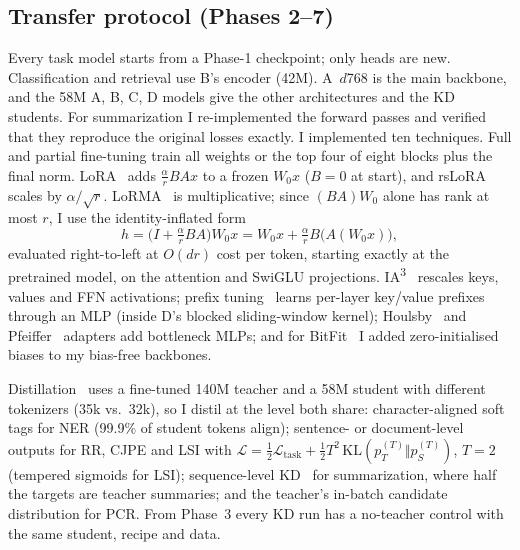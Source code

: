 \documentclass[11pt, oneside]{article}
\begin{document}
\subsection{Transfer protocol (Phases 2--7)}
Every task model starts from a Phase-1 checkpoint; only heads are new. Classification and retrieval use B's encoder
(42M). A~$d$768 is the main backbone, and the 58M A, B, C, D models give the other architectures and the KD students.
For summarization I re-implemented the forward passes and verified that they reproduce the original losses exactly.
I implemented ten techniques. Full and partial fine-tuning train all weights or the top four of eight blocks plus the
final norm. LoRA~\cite{hu2022lora} adds $\tfrac{\alpha}{r}BAx$ to a frozen $W_0x$ ($B=0$ at start), and
rsLoRA~\cite{kalajdzievski2023rslora} scales by $\alpha/\sqrt{r}$. LoRMA~\cite{bihany2025lorma} is multiplicative; since
$(BA)W_0$ alone has rank at most $r$, I use the identity-inflated form
\begin{equation}
h=\bigl(I+\tfrac{\alpha}{r}BA\bigr)W_0x = W_0x+\tfrac{\alpha}{r}B\bigl(A(W_0x)\bigr),
\end{equation}
evaluated right-to-left at $O(dr)$ cost per token, starting exactly at the pretrained model, on the attention and
SwiGLU projections. IA\textsuperscript{3}~\cite{liu2022ia3} rescales keys, values and FFN activations; prefix
tuning~\cite{li2021prefix} learns per-layer key/value prefixes through an MLP (inside D's blocked sliding-window
kernel); Houlsby~\cite{houlsby2019adapters} and Pfeiffer~\cite{pfeiffer2021adapterfusion} adapters add bottleneck MLPs;
and for BitFit~\cite{benzaken2022bitfit} I added zero-initialised biases to my bias-free backbones.

Distillation~\cite{hinton2015distilling} uses a fine-tuned 140M teacher and a 58M student with different tokenizers
(35k vs.\ 32k), so I distil at the level both share: character-aligned soft tags for NER (99.9\% of student tokens
align); sentence- or document-level outputs for RR, CJPE and LSI with
$\mathcal{L}=\tfrac12\mathcal{L}_{\text{task}}+\tfrac12T^2\,\mathrm{KL}(p_T^{(T)}\Vert p_S^{(T)})$, $T=2$ (tempered sigmoids
for LSI); sequence-level KD~\cite{kim2016seqkd} for summarization, where half the targets are teacher summaries; and
the teacher's in-batch candidate distribution for PCR. From Phase~3 every KD run has a no-teacher control with the
same student, recipe and data.
\end{document}
